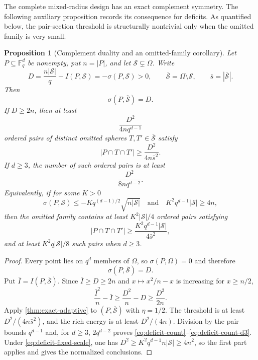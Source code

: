 \documentclass[11pt,letterpaper]{amsart}
\newtheorem{proposition}[proposition]{Proposition}
\theoremstyle{definition}
\theoremstyle{remark}
\newcommand{\1}{\mathbf 1}
\begin{document}
The complete mixed-radius design has an exact complement symmetry.  The following auxiliary proposition records its consequence for deficits.  As quantified below, the pair-section threshold is structurally nontrivial only when the omitted family is very small.

\begin{proposition}[Complement duality and an omitted-family corollary]\label{prop:deficit-complement}
Let $P\subseteq\mathbb F_q^d$ be nonempty, put $n=|P|$, and let $\mathcal S\subsetneq\Omega$.  Write
\[
 D=\frac{n|\mathcal S|}{q}-I(P,\mathcal S)=-\sigma(P,\mathcal S)>0,
 \qquad
 \overline{\mathcal S}=\Omega\setminus\mathcal S,
 \qquad
 \bar s=|\overline{\mathcal S}|.
\]
Then
\begin{equation}\label{eq:deficit-duality}
 \sigma(P,\overline{\mathcal S})=D.
\end{equation}
If $D\ge2n$, then at least
\begin{equation}\label{eq:deficit-count}
 \frac{D^2}{4nq^{d-1}}
\end{equation}
ordered pairs of distinct omitted spheres $T,T'\in\overline{\mathcal S}$ satisfy
\begin{equation}\label{eq:deficit-section}
 |P\cap T\cap T'|
 \ge\frac{D^2}{4n\bar s^2}.
\end{equation}
If $d\ge3$, the number of such ordered pairs is at least
\begin{equation}\label{eq:deficit-count-d3}
 \frac{D^2}{8nq^{d-2}}.
\end{equation}
Equivalently, if for some $K>0$
\begin{equation}\label{eq:deficit-fixed-scale}
 \sigma(P,\mathcal S)
 \le-Kq^{(d-1)/2}\sqrt{n|\mathcal S|}
 \quad\text{and}\quad
 K^2q^{d-1}|\mathcal S|\ge4n,
\end{equation}
then the omitted family contains at least $K^2|\mathcal S|/4$ ordered pairs satisfying
\begin{equation}\label{eq:deficit-fixed-section}
 |P\cap T\cap T'|
 \ge\frac{K^2q^{d-1}|\mathcal S|}{4\bar s^2},
\end{equation}
and at least $K^2q|\mathcal S|/8$ such pairs when $d\ge3$.
\end{proposition}

\begin{proof}
Every point lies on $q^d$ members of $\Omega$, so $\sigma(P,\Omega)=0$ and therefore
\[
 \sigma(P,\overline{\mathcal S})=D.
\]
Put $\bar I=I(P,\overline{\mathcal S})$.  Since $\bar I\ge D\ge2n$ and $x\mapsto x^2/n-x$ is increasing for $x\ge n/2$,
\[
 \frac{\bar I^2}{n}-\bar I
 \ge\frac{D^2}{n}-D
 \ge\frac{D^2}{2n}.
\]
Apply \cref{thm:exact-adaptive} to $(P,\overline{\mathcal S})$ with $\eta=1/2$.  The threshold is at least $D^2/(4n\bar s^2)$, and the rich energy is at least $D^2/(4n)$.  Division by the pair bounds $q^{d-1}$ and, for $d\ge3$, $2q^{d-2}$ proves \eqref{eq:deficit-count}--\eqref{eq:deficit-count-d3}.  Under \eqref{eq:deficit-fixed-scale}, one has $D^2\ge K^2q^{d-1}n|\mathcal S|\ge4n^2$, so the first part applies and gives the normalized conclusions.
\end{proof}
\end{document}
